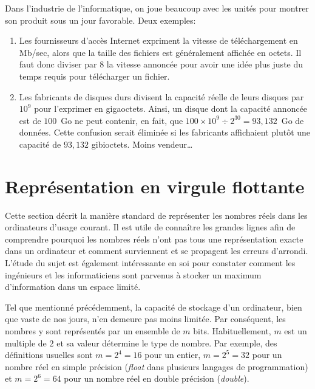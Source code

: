 \documentclass[letterpaper,11pt]{memoir}
\theoremstyle{plain}
\theoremstyle{definition}
\theoremstyle{remark}
\begin{document}
Dans l'industrie de l'informatique, on joue beaucoup avec les unités
pour montrer son produit sous un jour favorable. Deux exemples:
\begin{enumerate}
\item Les fournisseurs d'accès Internet expriment la vitesse de
  téléchargement en Mb/sec, alors que la taille des fichiers est
  généralement affichée en octets. Il faut donc diviser par 8 la
  vitesse annoncée pour avoir une idée plus juste du temps requis pour
  télécharger un fichier.
\item Les fabricants de disques durs divisent la capacité réelle de
  leurs disques par $10^9$ pour l'exprimer en gigaoctets. Ainsi, un
  disque dont la capacité annoncée est de $100$~Go ne peut contenir, en
  fait, que $100 \times 10^9 \div 2^{30} = 93,132$~Go de données.
  Cette confusion serait éliminée si les fabricants affichaient plutôt
  une capacité de $93,132$ gibioctets. Moins vendeur\dots
\end{enumerate}



\section{Représentation en virgule flottante}
\label{sec:ordinateurs:ieee}

Cette section décrit la manière standard de représenter les nombres
réels dans les ordinateurs d'usage courant. Il est utile de
connaître les grandes lignes afin de comprendre pourquoi les nombres
réels n'ont pas tous une représentation exacte dans un ordinateur et
comment surviennent et se propagent les erreurs d'arrondi. L'étude du
sujet est également intéressante en soi pour constater comment les
ingénieurs et les informaticiens sont parvenus à stocker un maximum
d'information dans un espace limité.

Tel que mentionné précédemment, la capacité de stockage d'un
ordinateur, bien que vaste de nos jours, n'en demeure pas moins
limitée. Par conséquent, les nombres y sont représentés par un
ensemble de $m$ bits. Habituellement, $m$ est un multiple de $2$ et sa
valeur détermine le type de nombre. Par exemple, des définitions
usuelles sont $m = 2^4 = 16$ pour un entier, $m = 2^5 = 32$ pour un
nombre réel en simple précision (\emph{float} dans plusieurs langages
de programmation) et $m = 2^6 = 64$ pour un nombre réel en double
précision (\emph{double}).
\end{document}
